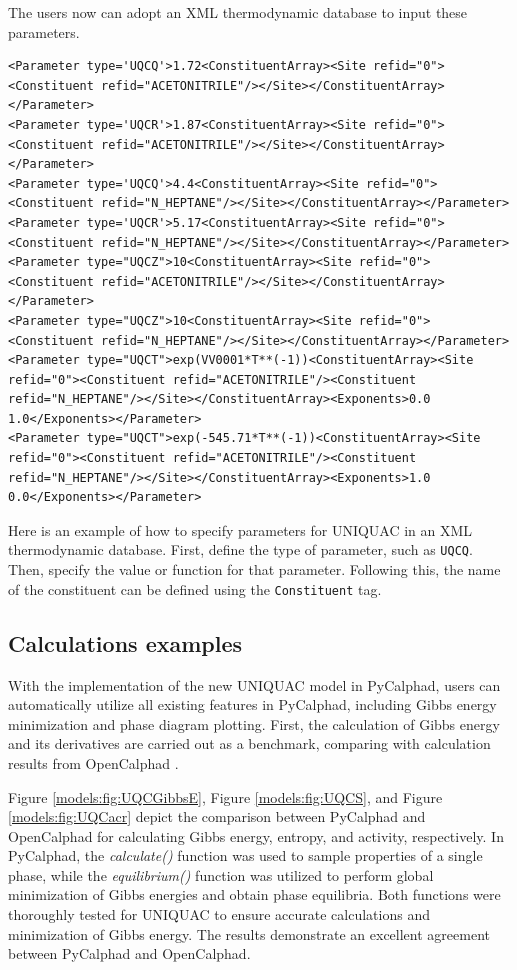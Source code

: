 The users now can adopt an XML thermodynamic database to input these parameters.
\begin{verbatim}
<Parameter type='UQCQ'>1.72<ConstituentArray><Site refid="0"><Constituent refid="ACETONITRILE"/></Site></ConstituentArray></Parameter>
<Parameter type='UQCR'>1.87<ConstituentArray><Site refid="0"><Constituent refid="ACETONITRILE"/></Site></ConstituentArray></Parameter>
<Parameter type='UQCQ'>4.4<ConstituentArray><Site refid="0"><Constituent refid="N_HEPTANE"/></Site></ConstituentArray></Parameter>
<Parameter type='UQCR'>5.17<ConstituentArray><Site refid="0"><Constituent refid="N_HEPTANE"/></Site></ConstituentArray></Parameter>
<Parameter type="UQCZ">10<ConstituentArray><Site refid="0"><Constituent refid="ACETONITRILE"/></Site></ConstituentArray></Parameter>
<Parameter type="UQCZ">10<ConstituentArray><Site refid="0"><Constituent refid="N_HEPTANE"/></Site></ConstituentArray></Parameter>
<Parameter type="UQCT">exp(VV0001*T**(-1))<ConstituentArray><Site refid="0"><Constituent refid="ACETONITRILE"/><Constituent refid="N_HEPTANE"/></Site></ConstituentArray><Exponents>0.0 1.0</Exponents></Parameter>
<Parameter type="UQCT">exp(-545.71*T**(-1))<ConstituentArray><Site refid="0"><Constituent refid="ACETONITRILE"/><Constituent refid="N_HEPTANE"/></Site></ConstituentArray><Exponents>1.0 0.0</Exponents></Parameter>
\end{verbatim}

Here is an example of how to specify parameters for UNIQUAC in an XML thermodynamic database. First, define the type of parameter, such as \texttt{UQCQ}. Then, specify the value or function for that parameter. Following this, the name of the constituent can be defined using the \texttt{Constituent} tag.

\subsection{Calculations examples} \label{models:ssec:UNIQUACexamples}
With the implementation of the new UNIQUAC model in PyCalphad, users can automatically utilize all existing features in PyCalphad, including Gibbs energy minimization and phase diagram plotting. First, the calculation of Gibbs energy and its derivatives are carried out as a benchmark, comparing with calculation results from OpenCalphad \cite{li2020implementation}.

Figure \ref{models:fig:UQCGibbsE}, Figure \ref{models:fig:UQCS}, and Figure \ref{models:fig:UQCacr} depict the comparison between PyCalphad and OpenCalphad for calculating Gibbs energy, entropy, and activity, respectively. In PyCalphad, the \textit{calculate()} function was used to sample properties of a single phase, while the \textit{equilibrium()} function was utilized to perform global minimization of Gibbs energies and obtain phase equilibria. Both functions were thoroughly tested for UNIQUAC to ensure accurate calculations and minimization of Gibbs energy. The results demonstrate an excellent agreement between PyCalphad and OpenCalphad. 

